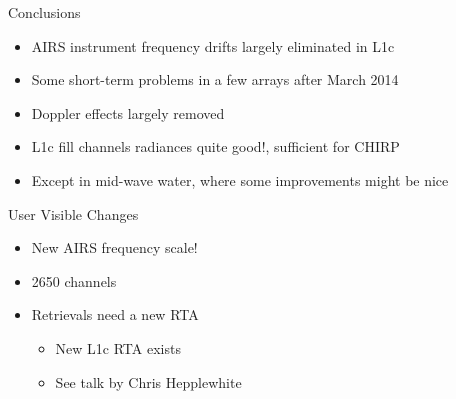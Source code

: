 \documentclass[10pt,t]{beamer}
\begin{document}
\begin{frame}[label={sec:orgb3e8519}]{Conclusions}
\begin{itemize}
\item AIRS instrument frequency drifts largely eliminated in L1c
\item Some short-term problems in a few arrays after March 2014
\item Doppler effects largely removed
\item L1c fill channels radiances quite good!, sufficient for CHIRP
\item Except in mid-wave water, where some improvements might be nice
\end{itemize}

\begin{block}{User Visible Changes}
\begin{itemize}
\item New AIRS frequency scale!
\item 2650 channels
\item Retrievals need a new RTA 
\begin{itemize}
\item New L1c RTA exists
\item See talk by Chris Hepplewhite
\end{itemize}
\end{itemize}
\end{block}
\end{frame}
\end{document}
